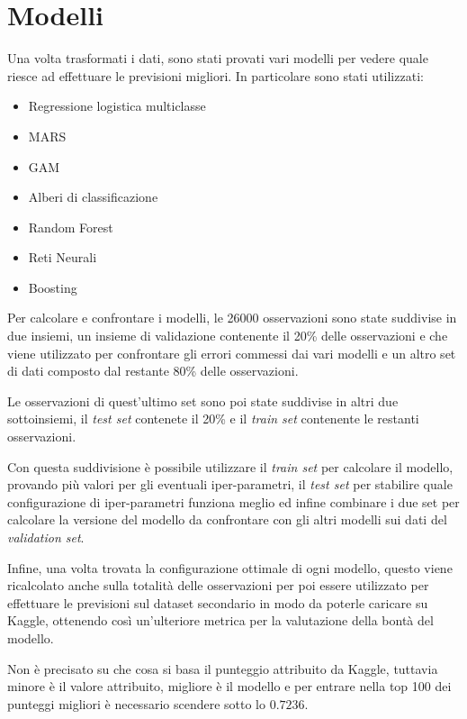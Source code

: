 
\section{Modelli}

Una volta trasformati i dati, sono stati provati vari modelli per vedere quale riesce ad effettuare le previsioni migliori.
In particolare sono stati utilizzati:

\begin{itemize}
	\item Regressione logistica multiclasse
	\item MARS
	\item GAM
	\item Alberi di classificazione
	\item Random Forest
	\item Reti Neurali
	\item Boosting
\end{itemize}

Per calcolare e confrontare i modelli, le 26000 osservazioni sono state suddivise in due insiemi, un insieme di validazione contenente il 20\% delle osservazioni e che viene utilizzato per confrontare gli errori commessi dai vari modelli e un altro set di dati composto dal restante 80\% delle osservazioni.

Le osservazioni di quest'ultimo set sono poi state suddivise in altri due sottoinsiemi, il \textit{test set} contenete il 20\% e il \textit{train set} contenente le restanti osservazioni. 

Con questa suddivisione è possibile utilizzare il \textit{train set} per calcolare il modello, provando più valori per gli eventuali iper-parametri, il \textit{test set} per stabilire quale configurazione di iper-parametri funziona meglio ed infine combinare i due set per calcolare la versione del modello da confrontare con gli altri modelli sui dati del \textit{validation set}.

Infine, una volta trovata la configurazione ottimale di ogni modello, questo viene ricalcolato anche sulla totalità delle osservazioni per poi essere utilizzato per effettuare le previsioni sul dataset secondario in modo da poterle caricare su Kaggle, ottenendo così un'ulteriore metrica per la valutazione della bontà del modello. 

Non è precisato su che cosa si basa il punteggio attribuito da Kaggle, tuttavia minore è il valore attribuito, migliore è il modello e per entrare nella top 100 dei punteggi migliori è necessario scendere sotto lo $0.7236$.

